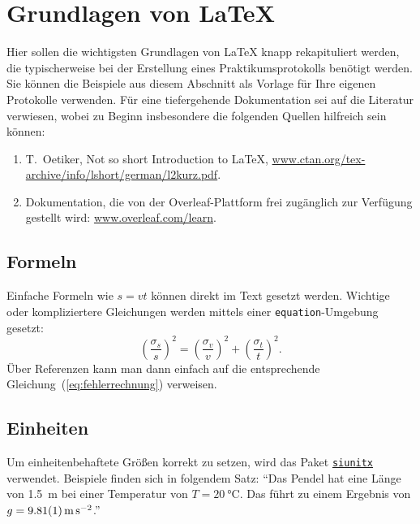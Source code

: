 \documentclass[twoside]{protokoll}
\begin{document}
\section*{Grundlagen von \LaTeX}
Hier sollen die wichtigsten Grundlagen von \LaTeX{} knapp rekapituliert
werden, die typischerweise bei der Erstellung eines
Praktikumsprotokolls benötigt werden. Sie können die Beispiele aus
diesem Abschnitt als Vorlage für Ihre eigenen Protokolle
verwenden. Für eine tiefergehende Dokumentation sei auf die Literatur
verwiesen, wobei zu Beginn insbesondere die folgenden Quellen
hilfreich sein können:
\begin{enumerate}
\item T.~Oetiker, Not so short Introduction to \LaTeX,
  \url{www.ctan.org/tex-archive/info/lshort/german/l2kurz.pdf}.
\item Dokumentation, die von der Overleaf-Plattform frei zugänglich
  zur Verfügung gestellt wird: \url{www.overleaf.com/learn}.
\end{enumerate}

\subsection*{Formeln}
Einfache Formeln wie $s=vt$ können direkt im Text gesetzt
werden. Wichtige oder kompliziertere Gleichungen werden mittels einer
\texttt{equation}-Umgebung gesetzt:
\begin{equation}
  \label{eq:fehlerrechnung}
  \left(\frac{\sigma_s}{s}\right)^2 =
  \left(\frac{\sigma_v}{v}\right)^2 +
  \left(\frac{\sigma_t}{t}\right)^2.
\end{equation}
Über Referenzen kann man dann einfach auf die entsprechende
Gleichung~(\ref{eq:fehlerrechnung}) verweisen.

\subsection*{Einheiten}
Um einheitenbehaftete Größen korrekt zu setzen, wird das Paket
\href{https://ctan.org/pkg/siunitx?lang=de}{\texttt{siunitx}}
verwendet. Beispiele finden sich in folgendem Satz: ``Das Pendel hat
eine Länge von \SI{1.5}{m} bei einer Temperatur von
$T=\SI{20}{\degreeCelsius}$. Das führt zu einem Ergebnis von
$g=\SI{9.81+-0.01}{m.s^{-2}}$.''
\end{document}
